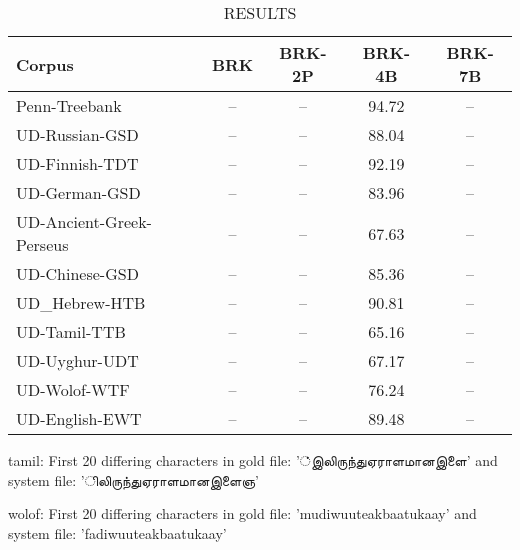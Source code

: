 \begin{table}[h]
\centering
\caption{RESULTS}
\label{tab:my_table}

\begin{tabular}{|l|c|c|c|c|}
\hline
\textbf{Corpus}                & \textbf{BRK} & \textbf{BRK-2P} & \textbf{BRK-4B} & \textbf{BRK-7B} \\ 
\hline
Penn-Treebank                  & --           & --              & 94.72           & --              \\
UD-Russian-GSD                 & --           & --              & 88.04           & --              \\
UD-Finnish-TDT                 & --           & --              & 92.19           & --              \\
UD-German-GSD                  & --           & --              & 83.96           & --              \\
UD-Ancient-Greek-Perseus       & --           & --              & 67.63           & --              \\
UD-Chinese-GSD                 & --           & --              & 85.36           & --              \\
UD_Hebrew-HTB                  & --           & --              & 90.81           & --              \\  
UD-Tamil-TTB                   & --           & --              & 65.16           & --              \\
UD-Uyghur-UDT                  & --           & --              & 67.17           & --              \\
UD-Wolof-WTF                   & --           & --              & 76.24           & --              \\
UD-English-EWT                 & --           & --              & 89.48           & --              \\
\hline

\end{tabular}
\end{table}

tamil: First 20 differing characters in gold file: '்இலிருந்துஏராளமானஇளை' and system file: 'ிலிருந்துஏராளமானஇளைஞ'

wolof: First 20 differing characters in gold file: 'mudiwuuteakbaatukaay' and system file: 'fadiwuuteakbaatukaay'


